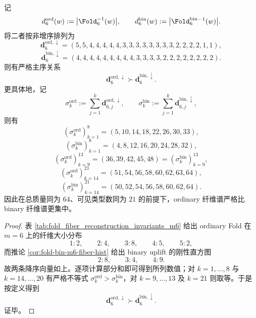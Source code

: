 \begin{theorem}\label{thm:conclusion-window6-ordinary-binary-strict-majorization}
记
\[
d_6^{\mathrm{ord}}(w):=\bigl|\Fold_6^{-1}(w)\bigr|,
\qquad
d_6^{\mathrm{bin}}(w):=\bigl|\Fold_6^{\mathrm{bin}}{}^{-1}(w)\bigr|.
\]
将二者按非增序排列为
\[
\mathbf d_6^{\mathrm{ord},\downarrow}
=(5,5,4,4,4,4,4,3,3,3,3,3,3,3,3,2,2,2,2,1,1),
\]
\[
\mathbf d_6^{\mathrm{bin},\downarrow}
=(4,4,4,4,4,4,4,4,4,3,3,3,3,2,2,2,2,2,2,2,2).
\]
则有严格主序关系
\[
\mathbf d_6^{\mathrm{ord},\downarrow}\succ \mathbf d_6^{\mathrm{bin},\downarrow}.
\]
更具体地，记
\[
\sigma_k^{\mathrm{ord}}:=\sum_{j=1}^k \mathbf d_{6,j}^{\mathrm{ord},\downarrow},
\qquad
\sigma_k^{\mathrm{bin}}:=\sum_{j=1}^k \mathbf d_{6,j}^{\mathrm{bin},\downarrow},
\]
则有
\[
(\sigma_k^{\mathrm{ord}})_{k=1}^{8}=(5,10,14,18,22,26,30,33),
\]
\[
(\sigma_k^{\mathrm{bin}})_{k=1}^{8}=(4,8,12,16,20,24,28,32),
\]
\[
(\sigma_k^{\mathrm{ord}})_{k=9}^{13}=(36,39,42,45,48)
=(\sigma_k^{\mathrm{bin}})_{k=9}^{13},
\]
\[
(\sigma_k^{\mathrm{ord}})_{k=14}^{21}=(51,54,56,58,60,62,63,64),
\]
\[
(\sigma_k^{\mathrm{bin}})_{k=14}^{21}=(50,52,54,56,58,60,62,64).
\]
因此在总质量同为 \(64\)、可见类型数同为 \(21\) 的前提下，ordinary 纤维谱严格比 binary 纤维谱更集中。
\end{theorem}
\begin{proof}
表 \ref{tab:fold_fiber_reconstruction_invariants_m6} 给出 ordinary Fold 在 \(m=6\) 上的纤维大小分布
\[
1:2,\qquad 2:4,\qquad 3:8,\qquad 4:5,\qquad 5:2,
\]
而推论 \ref{cor:fold-bin-m6-fiber-hist} 给出 binary uplift 的刚性直方图
\[
2:8,\qquad 3:4,\qquad 4:9.
\]
故两条降序向量如上。逐项计算部分和即可得到所列数值；对 \(k=1,\dots,8\) 与 \(k=14,\dots,20\) 有严格不等式 \(\sigma_k^{\mathrm{ord}}>\sigma_k^{\mathrm{bin}}\)，对 \(k=9,\dots,13\) 及 \(k=21\) 则取等。于是按定义得到
\[
\mathbf d_6^{\mathrm{ord},\downarrow}\succ \mathbf d_6^{\mathrm{bin},\downarrow}.
\]
证毕。
\end{proof}

